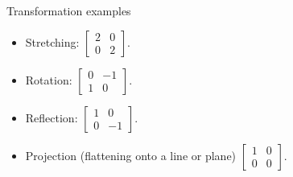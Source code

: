 \documentclass{beamer}
\begin{document}
\begin{frame}{Transformation examples}
  \begin{itemize}
    \item Stretching:
    $\begin{bmatrix} 2 & 0 \\ 0 & 2 \end{bmatrix}.$ %
    \item Rotation:
    $\begin{bmatrix} 0 & -1 \\ 1 & 0 \end{bmatrix}.$
    \item Reflection:
    $\begin{bmatrix} 1 & 0 \\ 0 & -1 \end{bmatrix}.$
    \item Projection (flattening onto a line or plane) $\begin{bmatrix} 1 & 0 \\ 0 & 0 \end{bmatrix}.$
  \end{itemize}
\end{frame}
\end{document}
